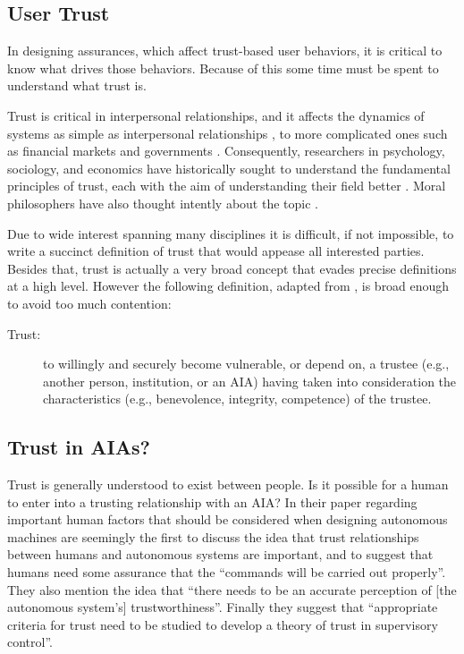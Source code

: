 \subsection{User Trust}
    In designing assurances, which affect trust-based user behaviors, it is critical to know what drives those behaviors. Because of this some time must be spent to understand what trust is. 

    Trust is critical in interpersonal relationships, and it affects the dynamics of systems as simple as interpersonal relationships \cite{Lewicki2006-hj}, to more complicated ones such as financial markets and governments \cite{Fukuyama1995-un}. Consequently, researchers in psychology, sociology, and economics have historically sought to understand the fundamental principles of trust, each with the aim of understanding their field better \cite{Gambetta1988-pi}. Moral philosophers have also thought intently about the topic \cite{Baier1986-im}.

    Due to wide interest spanning many disciplines it is difficult, if not impossible, to write a succinct definition of trust that would appease all interested parties. Besides that, trust is actually a very broad concept that evades precise definitions at a high level. However the following definition, adapted from \cite{McKnight2004-vv}, is broad enough to avoid too much contention:

    \begin{description}
        \item [Trust:] to willingly and securely become vulnerable, or depend on, a trustee (e.g., another person, institution, or an AIA) having taken into consideration the characteristics (e.g., benevolence,  integrity,  competence)  of  the  trustee.
    \end{description}

    \subsection{Trust in AIAs?}
        Trust is generally understood to exist between people. Is it possible for a human to enter into a trusting relationship with an AIA? In their paper regarding important human factors that should be considered when designing autonomous machines \cite{Sheridan1984-kx} are seemingly the first to discuss the idea that trust relationships between humans and autonomous systems are important, and to suggest that humans need some assurance that the ``commands will be carried out properly''. They also mention the idea that ``there needs to be an accurate perception of [the autonomous system's] trustworthiness''. Finally they suggest that ``appropriate criteria for trust need to be studied to develop a theory of trust in supervisory control''.

